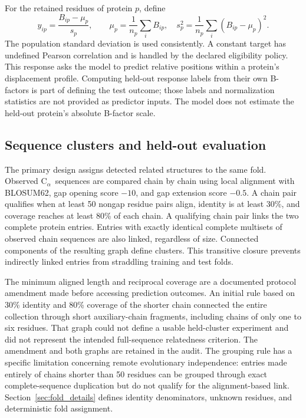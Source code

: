 \documentclass[11pt]{article}
\newcommand{\calpha}{C$_\alpha$}
\begin{document}
For the retained residues of protein $p$, define
\begin{equation}
y_{ip}=\frac{B_{ip}-\mu_p}{s_p},\qquad
\mu_p=\frac{1}{n_p}\sum_iB_{ip},\quad
s_p^2=\frac{1}{n_p}\sum_i(B_{ip}-\mu_p)^2.
\label{eq:target}
\end{equation}
The population standard deviation is used consistently. A constant target has undefined Pearson correlation and is handled by the declared eligibility policy. This response asks the model to predict relative positions within a protein's displacement profile. Computing held-out response labels from their own B-factors is part of defining the test outcome; those labels and normalization statistics are not provided as predictor inputs. The model does not estimate the held-out protein's absolute B-factor scale.


\subsection{Sequence clusters and held-out evaluation}
The primary design assigns detected related structures to the same fold. Observed \calpha\ sequences are compared chain by chain using local alignment with BLOSUM62, gap opening score $-10$, and gap extension score $-0.5$. A chain pair qualifies when at least 50 nongap residue pairs align, identity is at least 30\%, and coverage reaches at least 80\% of each chain. A qualifying chain pair links the two complete protein entries. Entries with exactly identical complete multisets of observed chain sequences are also linked, regardless of size. Connected components of the resulting graph define clusters. This transitive closure prevents indirectly linked entries from straddling training and test folds.

The minimum aligned length and reciprocal coverage are a documented protocol amendment made before accessing prediction outcomes. An initial rule based on 30\% identity and 80\% coverage of the shorter chain connected the entire collection through short auxiliary-chain fragments, including chains of only one to six residues. That graph could not define a usable held-cluster experiment and did not represent the intended full-sequence relatedness criterion. The amendment and both graphs are retained in the audit. The grouping rule has a specific limitation concerning remote evolutionary independence: entries made entirely of chains shorter than 50 residues can be grouped through exact complete-sequence duplication but do not qualify for the alignment-based link. Section~\ref{sec:fold_details} defines identity denominators, unknown residues, and deterministic fold assignment.
\end{document}
